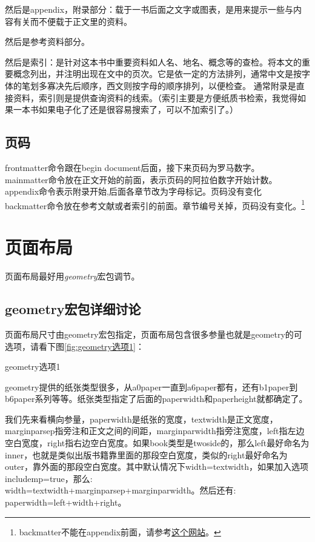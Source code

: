 \documentclass[12pt,oneside]{book}
\begin{document}
\begin{common-format}
然后是appendix，附录部分：载于一书后面之文字或图表，是用来提示一些与内容有关而不便载于正文里的资料。

然后是参考资料部分。

然后是索引：是针对这本书中重要资料如人名、地名、概念等的查检。将本文的重要概念列出，并注明出现在文中的页次。它是依一定的方法排列，通常中文是按字体的笔划多寡决先后顺序，西文则按字母的顺序排列，以便检查。 通常附录是直接资料，索引则是提供查询资料的线索。（索引主要是方便纸质书检索，我觉得如果一本书如果电子化了还是很容易搜索了，可以不加索引了。）


\subsection{页码}
\label{sec:页码}
frontmatter命令跟在begin document后面，接下来页码为罗马数字。\\
mainmatter命令放在正文开始的前面，表示页码的阿拉伯数字开始计数。\\ 
appendix命令表示附录开始,后面各章节改为字母标记。页码没有变化\\
backmatter命令放在参考文献或者索引的前面。章节编号关掉，页码没有变化。\footnote{backmatter不能在appendix前面，请参考\href{http://tex.stackexchange.com/questions/20538/what-is-the-right-order-when-using-frontmatter-tableofcontents-mainmatter}{这个网站}。}


\section{页面布局}
页面布局最好用\emph{geometry}宏包调节。

\subsection{geometry宏包详细讨论}
页面布局尺寸由geometry宏包指定，页面布局包含很多参量也就是geometry的可选项，请看下图\ref{fig:geometry选项1}：

\begin{linefig}{geometry选项1}   %
\caption{geometry选项1}
\label{fig:geometry选项1}
\end{linefig}

geometry提供的纸张类型很多，从a0paper一直到a6paper都有，还有b1paper到b6paper系列等等。纸张类型指定了后面的paperwidth和paperheight就都确定了。

我们先来看横向参量，paperwidth是纸张的宽度，textwidth是正文宽度，marginparsep指旁注和正文之间的间距，marginparwidth指旁注宽度，left指左边空白宽度，right指右边空白宽度。如果book类型是twoside的，那么left最好命名为inner，也就是类似出版书籍靠里面的那段空白宽度，类似的right最好命名为outer，靠外面的那段空白宽度。其中默认情况下width=textwidth，如果加入选项\\includemp=true，那么:\\width=textwidth+marginparsep+marginparwidth。然后还有:\\paperwidth=left+width+right。


\end{common-format}
\end{document}
